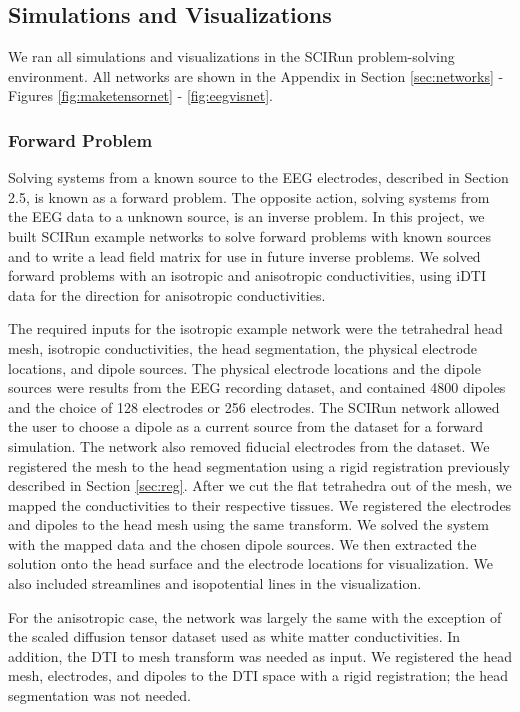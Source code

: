 \subsection{Simulations and Visualizations}
\label{sec:sim}

We ran all simulations and visualizations in the SCIRun problem-solving environment. All networks are shown in the Appendix in Section \ref{sec:networks} - Figures \ref{fig:maketensornet} - \ref{fig:eegvisnet}.

\subsubsection{Forward Problem}

Solving systems from a known source to the EEG electrodes, described in Section 2.5, is known as a forward problem. The opposite action, solving systems from the EEG data to a unknown source, is an inverse problem.  In this project, we built SCIRun example networks to solve forward problems with known sources and to write a lead field matrix for use in future inverse problems. We solved forward problems with an isotropic and anisotropic conductivities, using iDTI data for the direction for anisotropic conductivities.

The required inputs for the isotropic example network were the tetrahedral head mesh, isotropic conductivities, the head segmentation, the physical electrode locations, and dipole sources. The physical electrode locations and the dipole sources were results from the EEG recording dataset, and contained 4800 dipoles and the choice of 128 electrodes or 256 electrodes. The SCIRun network allowed the user to choose a dipole as a current source from the dataset for a forward simulation. The network also removed fiducial electrodes from the dataset. We registered the mesh to the head segmentation using a rigid registration previously described in Section \ref{sec:reg}. After we cut the flat tetrahedra out of the mesh, we mapped the conductivities to their respective tissues. We registered the electrodes and dipoles to the head mesh using the same transform. We solved the system with the mapped data and the chosen dipole sources. We then extracted the solution onto the head surface and the electrode locations for visualization. We also included streamlines and isopotential lines in the visualization.

For the anisotropic case, the network was largely the same with the exception of the scaled diffusion tensor dataset used as white matter conductivities. In addition, the DTI to mesh transform was needed as input. We registered the head mesh, electrodes, and dipoles to the DTI space with a rigid registration; the head segmentation was not needed.

